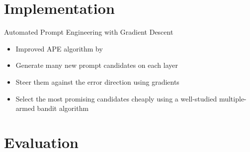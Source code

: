 \documentclass{sdqbeamer}
\begin{document}
\section{Implementation}

\begin{frame}[picture 50 vertical, picture=images/gradient_descent.pdf]{Automated Prompt Engineering with Gradient Descent}
    \begin{itemize}
        \item Improved APE algorithm by \cite{pryzant2023AutomaticPrompt}
        \item Generate many new prompt candidates on each layer
        \item Steer them against the error direction using gradients
        \item Select the most promising candidates cheaply using a well-studied multiple-armed bandit algorithm
    \end{itemize}

\end{frame}


\section{Evaluation}
\end{document}
